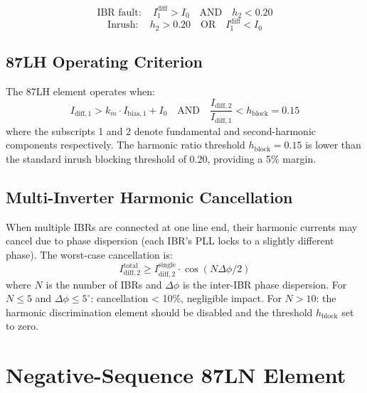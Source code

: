 \begin{equation}
  \text{IBR fault}: \quad I_1^\mathrm{diff} > I_0
  \quad\text{AND}\quad h_2 < 0.20
  \label{eq:ch4_87lh_ibr}
\end{equation}
\begin{equation}
  \text{Inrush}: \quad h_2 > 0.20
  \quad\text{OR}\quad I_1^\mathrm{diff} < I_0
  \label{eq:ch4_87lh_inrush}
\end{equation}

\subsection{87LH Operating Criterion}

The 87LH element operates when:
\begin{equation}
  I_\mathrm{diff,1} > k_m \cdot I_\mathrm{bias,1} + I_0
  \quad\text{AND}\quad \frac{I_\mathrm{diff,2}}{I_\mathrm{diff,1}} < h_\mathrm{block} = 0.15
  \label{eq:ch4_87lh_criterion}
\end{equation}
where the subscripts 1 and 2 denote fundamental and second-harmonic
components respectively. The harmonic ratio threshold $h_\mathrm{block} = 0.15$
is lower than the standard inrush blocking threshold of 0.20, providing
a 5\% margin.

\subsection{Multi-Inverter Harmonic Cancellation}

When multiple IBRs are connected at one line end, their harmonic currents
may cancel due to phase dispersion (each IBR's PLL locks to a slightly
different phase). The worst-case cancellation is:
\begin{equation}
  I_\mathrm{diff,2}^\mathrm{total} \geq I_\mathrm{diff,2}^\mathrm{single} \cdot \cos(N\Delta\phi/2)
  \label{eq:ch4_harmonic_cancel}
\end{equation}
where $N$ is the number of IBRs and $\Delta\phi$ is the inter-IBR phase
dispersion. For $N \leq 5$ and $\Delta\phi \leq 5^\circ$: cancellation < 10\%,
negligible impact. For $N > 10$: the harmonic discrimination element
should be disabled and the threshold $h_\mathrm{block}$ set to zero.

\section{Negative-Sequence 87LN Element}
\label{sec:ch4_87ln}

